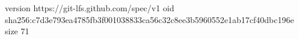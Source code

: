 version https://git-lfs.github.com/spec/v1
oid sha256:c7d3e793ea4785fb3f001038833ca56c32c8ee3b5960552e1ab17cf40dbc196e
size 71
